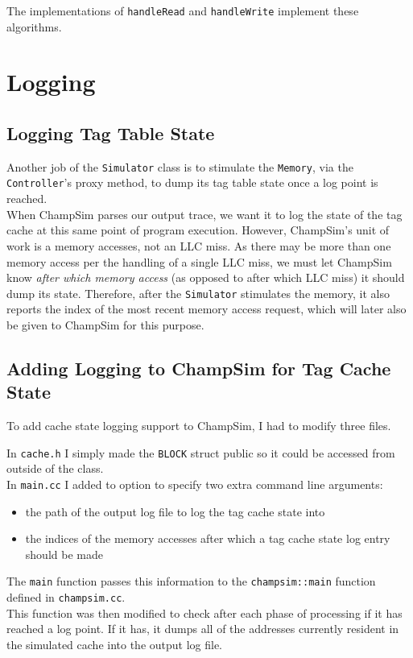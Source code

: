 The implementations of \texttt{handleRead} and \texttt{handleWrite} implement these algorithms.

\section{Logging}

\subsection{Logging Tag Table State}
Another job of the \texttt{Simulator} class is to stimulate the \texttt{Memory}, via the \texttt{Controller}'s proxy method, to dump its tag table state once a log point is reached.\\
When ChampSim parses our output trace, we want it to log the state of the tag cache at this same point of program execution. However, ChampSim's unit of work is a memory accesses, not an LLC miss. As there may be more than one memory access per the handling of a single LLC miss, we must let ChampSim know \textit{after which memory access} (as opposed to after which LLC miss) it should dump its state. Therefore, after the \texttt{Simulator} stimulates the memory, it also reports the index of the most recent memory access request, which will later also be given to ChampSim for this purpose.

\subsection{Adding Logging to ChampSim for Tag Cache State}
To add cache state logging support to ChampSim, I had to modify three files.

In \texttt{cache.h} I simply made the \texttt{BLOCK} struct public so it could be accessed from outside of the class.\\
In \texttt{main.cc} I added to option to specify two extra command line arguments:
\begin{itemize}
	\item the path of the output log file to log the tag cache state into
	\item the indices of the memory accesses after which a tag cache state log entry should be made
\end{itemize}
The \texttt{main} function passes this information to the \texttt{champsim::main} function defined in \texttt{champsim.cc}.\\
This function was then modified to check after each phase of processing if it has reached a log point. If it has, it dumps all of the addresses currently resident in the simulated cache into the output log file.

